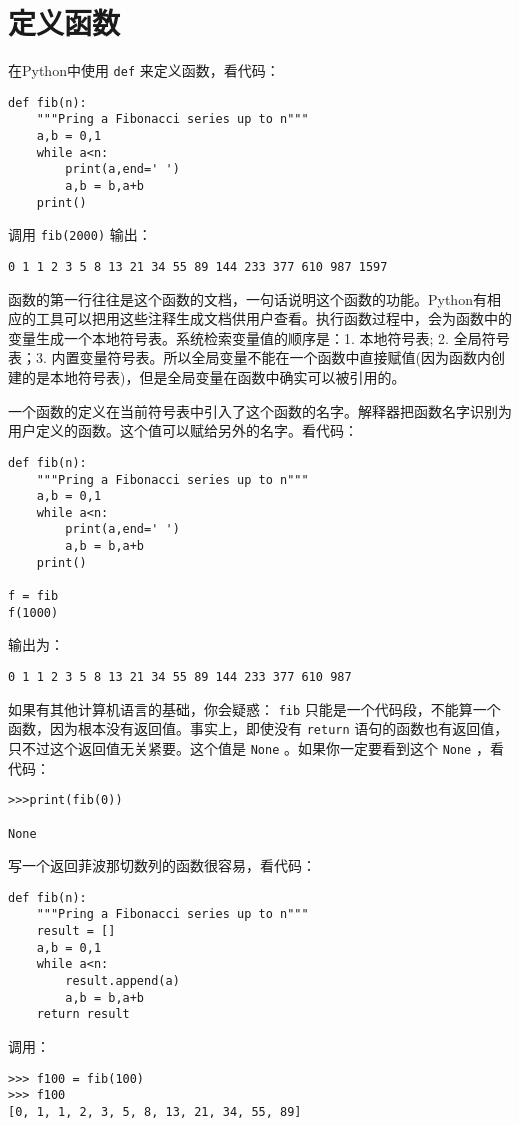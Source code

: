 \documentclass[10pt,a4paper,UTF8]{article}
\begin{document}
\section{定义函数}
\label{sec:orge7c490f}


在Python中使用 \texttt{def} 来定义函数，看代码：
\lstset{language=Python,label= ,caption= ,captionpos=b,numbers=none}
\begin{lstlisting}
def fib(n):
    """Pring a Fibonacci series up to n"""
    a,b = 0,1
    while a<n:
        print(a,end=' ')
        a,b = b,a+b
    print()
\end{lstlisting}

调用 \texttt{fib(2000)} 输出：
\begin{verbatim}
0 1 1 2 3 5 8 13 21 34 55 89 144 233 377 610 987 1597
\end{verbatim}

函数的第一行往往是这个函数的文档，一句话说明这个函数的功能。Python有相应的工具可以把用这些注释生成文档供用户查看。执行函数过程中，会为函数中的变量生成一个本地符号表。系统检索变量值的顺序是：1. 本地符号表; 2. 全局符号表；3. 内置变量符号表。所以全局变量不能在一个函数中直接赋值(因为函数内创建的是本地符号表)，但是全局变量在函数中确实可以被引用的。

一个函数的定义在当前符号表中引入了这个函数的名字。解释器把函数名字识别为用户定义的函数。这个值可以赋给另外的名字。看代码：
\lstset{language=Python,label= ,caption= ,captionpos=b,numbers=none}
\begin{lstlisting}
def fib(n):
    """Pring a Fibonacci series up to n"""
    a,b = 0,1
    while a<n:
        print(a,end=' ')
        a,b = b,a+b
    print()

f = fib
f(1000)
\end{lstlisting}

输出为：
\begin{verbatim}
0 1 1 2 3 5 8 13 21 34 55 89 144 233 377 610 987
\end{verbatim}

如果有其他计算机语言的基础，你会疑惑： \texttt{fib} 只能是一个代码段，不能算一个函数，因为根本没有返回值。事实上，即使没有 \texttt{return} 语句的函数也有返回值，只不过这个返回值无关紧要。这个值是 \texttt{None} 。如果你一定要看到这个 \texttt{None} ，看代码：
\begin{verbatim}
>>>print(fib(0))

None
\end{verbatim}

写一个返回菲波那切数列的函数很容易，看代码：
\lstset{language=Python,label= ,caption= ,captionpos=b,numbers=none}
\begin{lstlisting}
def fib(n):
    """Pring a Fibonacci series up to n"""
    result = []
    a,b = 0,1
    while a<n:
        result.append(a)
        a,b = b,a+b
    return result
\end{lstlisting}
调用：
\lstset{language=Python,label= ,caption= ,captionpos=b,numbers=none}
\begin{lstlisting}
>>> f100 = fib(100)
>>> f100
[0, 1, 1, 2, 3, 5, 8, 13, 21, 34, 55, 89]
\end{lstlisting}
\end{document}
